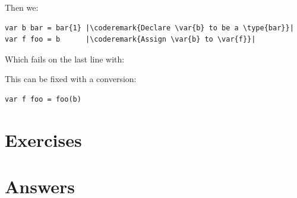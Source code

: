 Then we:
\begin{lstlisting}
var b bar = bar{1} |\coderemark{Declare \var{b} to be a \type{bar}}|
var f foo = b	   |\coderemark{Assign \var{b} to \var{f}}|
\end{lstlisting}
Which fails on the last line with:

\noindent{}

This can be fixed with a conversion:
\begin{lstlisting}
var f foo = foo(b)
\end{lstlisting}

\section{Exercises}












\cleardoublepage
\section{Answers}
\shipoutAnswer
